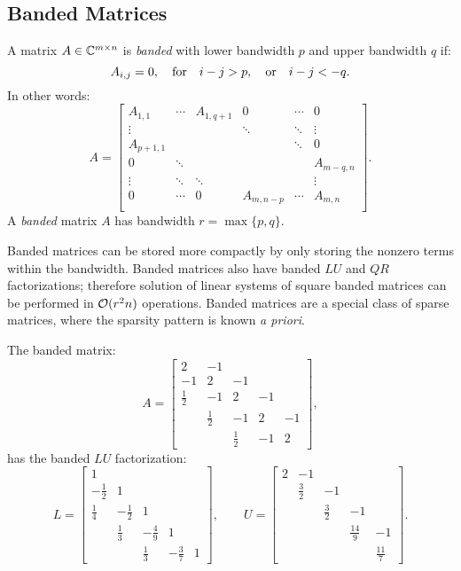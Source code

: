 \subsection{Banded Matrices}

\begin{definition}
A matrix $A\in\mathbb{C}^{m\times n}$ is {\em banded} with lower bandwidth $p$ and upper bandwidth $q$ if:
\[
A_{i,j} = 0,\quad{\rm for}\quad i-j > p,\quad{\rm or}\quad i-j < -q.
\]
In other words:
\[
A = \begin{bmatrix}
A_{1,1} & \cdots & A_{1,q+1} & 0 & \cdots & 0\\
\vdots & & & \ddots & \ddots & \vdots\\
A_{p+1,1} & & & & \ddots & 0\\
0 & \ddots & & & & A_{m-q,n}\\
\vdots & \ddots & \ddots & & & \vdots\\
0 & \cdots & 0 & A_{m,n-p} & \cdots & A_{m,n}\\
\end{bmatrix}.
\]
A {\em banded} matrix $A$ has bandwidth $r = \max\{p,q\}$.
\end{definition}

Banded matrices can be stored more compactly by only storing the nonzero terms within the bandwidth. Banded matrices also have banded $LU$ and $QR$ factorizations; therefore solution of linear systems of square banded matrices can be performed in $\mathcal{O}(r^2n)$ operations. Banded matrices are a special class of sparse matrices, where the sparsity pattern is known {\em a priori}.

\begin{example}
The banded matrix:
\[
A = \begin{bmatrix} 2 & -1\\ -1 & 2 & -1\\ \frac{1}{2} & -1 & 2 & -1\\ & \frac{1}{2} & -1 & 2 & -1\\ & & \frac{1}{2} & -1 & 2\end{bmatrix},
\]
has the banded $LU$ factorization:
\[
L = \begin{bmatrix} 1\\ -\frac{1}{2} & 1\\ \frac{1}{4} & -\frac{1}{2} & 1\\ & \frac{1}{3} & -\frac{4}{9} & 1\\ & & \frac{1}{3} & -\frac{3}{7} & 1\end{bmatrix},\qquad
U = \begin{bmatrix} 2 & -1\\ & \frac{3}{2} & -1\\ & & \frac{3}{2} & -1\\ & & & \frac{14}{9} & -1\\ & & & & \frac{11}{7}\end{bmatrix}.
\]
\end{example}

